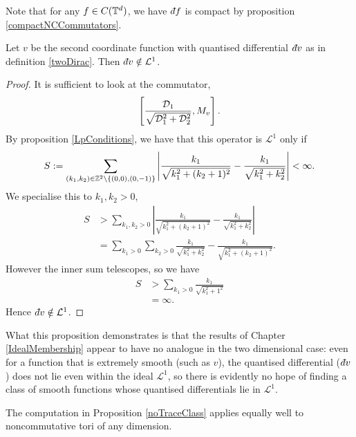Note that for any $f \in C(\mathbb{T}^d)$, we have $\qd f$ is compact
by proposition \ref{compactNCCommutators}.



\begin{proposition}
\label{noTraceClass}
    Let $v$ be the second coordinate function with quantised differential
    $\qd v$ as in definition \ref{twoDirac}. Then $\qd v \notin \mathcal{L}^1$.
\end{proposition}
\begin{proof}
    It is sufficient to look at the commutator,
    \begin{equation}
        \left[\frac{\mathcal{D}_1}{\sqrt{\mathcal{D}_1^2+\mathcal{D}_2^2}},M_v\right].
    \end{equation}
    By proposition \ref{LpConditions}, we have that this operator is $\mathcal{L}^1$
     only if
    \begin{equation}
        S := \sum_{(k_1,k_2)\in\mathbb{Z}^2\setminus \{(0,0),(0,-1)\}} \left|\frac{k_1}{\sqrt{k_1^2+(k_2+1)^2}}-\frac{k_1}{\sqrt{k_1^2+k_2^2}}\right| < \infty.
    \end{equation}
    We specialise this to $k_1,k_2 > 0$,
    \begin{align}
        S &> \sum_{k_1,k_2 > 0} \left|\frac{k_1}{\sqrt{k_1^2+(k_2+1)^2}}-\frac{k_1}{\sqrt{k_1^2+k_2^2}}\right|\\
        &= \sum_{k_1 > 0}\sum_{k_2 > 0} \frac{k_1}{\sqrt{k_1^2+k_2^2}}-\frac{k_1}{\sqrt{k_1^2+(k_2+1)^2}}. 
    \end{align}
    However the inner sum telescopes, so we have
    \begin{align}
        S &> \sum_{k_1 > 0} \frac{k_1}{\sqrt{k_1^2+1^2}}\\
        &= \infty.
    \end{align}
    Hence $\qd v \notin \mathcal{L}^1$. 
\end{proof}
What this proposition demonstrates is that the results
of Chapter \ref{IdealMembership} appear to have no analogue
in the two dimensional case: even for a function that is extremely smooth (such as
$v$), the quantised differential ($\qd v$) does not lie even within
the ideal $\mathcal{L}^1$, so there is evidently no hope 
of finding a class of smooth functions whose quantised differentials
lie in $\mathcal{L}^{1}$.

\begin{remark}
    The computation in Proposition \ref{noTraceClass} applies equally
    well to noncommutative tori of any dimension. 
\end{remark}

